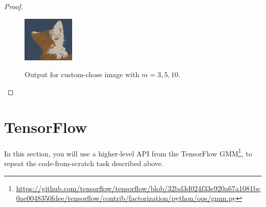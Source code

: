 \documentclass[12pt]{article}
\newcommand{\1}{\mathbf{1}}
\begin{document}
{\begin{itemize}
\begin{proof}
    \begin{figure}[htbp]
    \centering
    {
    \includegraphics[width=0.22\textwidth]{../figures/cat-part2-3.png}
    }
    \caption{Output for custom-chose image with $m=3,5,10$.\label{fig:part2-2}}
    \end{figure}
  \end{proof}
\end{itemize}

\section{TensorFlow}
In this section, you will use a higher-level API from the TensorFlow GMM\footnote{\url{https://github.com/tensorflow/tensorflow/blob/32bd3d024f33e920a67a1081bc0ae0048350fdee/tensorflow/contrib/factorization/python/ops/gmm.py}}, to repeat the code-from-scratch task described above.

}
\end{document}
